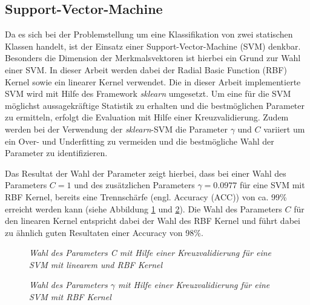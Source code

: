 \subsection{Support-Vector-Machine}
Da es sich bei der Problemstellung um eine Klassifikation von zwei statischen Klassen handelt, ist der Einsatz einer Support-Vector-Machine (SVM) denkbar. Besonders die Dimension der Merkmalsvektoren ist hierbei ein Grund zur Wahl einer SVM. In dieser Arbeit werden dabei der \glqq Radial Basic Function\grqq{} (RBF) Kernel sowie ein linearer Kernel verwendet.
Die in dieser Arbeit implementierte SVM wird mit Hilfe des Framework \textit{sklearn} umgesetzt. Um eine für die SVM möglichst aussagekräftige Statistik zu erhalten und die bestmöglichen Parameter zu ermitteln, erfolgt die Evaluation mit Hilfe einer Kreuzvalidierung. Zudem werden bei der Verwendung der \textit{sklearn}-SVM die Parameter $\gamma$ und $C$ variiert um ein Over- und Underfitting zu vermeiden und die bestmögliche Wahl der Parameter zu identifizieren.

Das Resultat der Wahl der Parameter zeigt hierbei, dass bei einer Wahl des Parameters $C=1$ und des zusätzlichen Parameters $\gamma = 0.0977$ für eine SVM mit RBF Kernel, bereits eine Trennschärfe (engl. \glqq Accuracy\grqq{} (ACC)) von ca. 99\% erreicht werden kann (siehe Abbildung \ref{fig:c_chooseSVM} und \ref{fig:gamma_chooseSVM}). Die Wahl des Parameters $C$ für den linearen Kernel entspricht dabei der Wahl des RBF Kernel und führt dabei zu ähnlich guten Resultaten einer Accuracy von 98\%.

\begin{figure}[h!]
\centering

\caption{\em Wahl des Parameters C mit Hilfe einer Kreuzvalidierung für eine SVM mit linearem und RBF Kernel}
\label{fig:c_chooseSVM}
\end{figure}

\begin{figure}[h!]
\centering

\caption{\em Wahl des Parameters $\gamma$ mit Hilfe einer Kreuzvalidierung für eine SVM mit RBF Kernel}
\label{fig:gamma_chooseSVM}
\end{figure}
